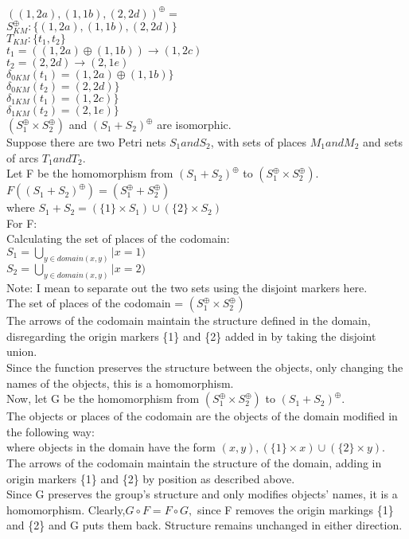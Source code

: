 $((1, 2a), (1, 1b), (2, 2d))^\oplus = $\\
$S_{KM}^\oplus: \{(1, 2a), (1, 1b), (2, 2d) \}$\\
$T_{KM}: \{t_1, t_2\}$\\
$t_1 = ((1, 2a) \oplus (1, 1b)) \rightarrow (1, 2c)$\\
$t_2 = (2, 2d) \rightarrow (2, 1e)$\\
$\delta_{0KM} (t_1) = (1, 2a) \oplus (1, 1b) \}$\\
$\delta_{0KM} (t_2) = (2, 2d) \}$\\
$\delta_{1KM} (t_1) = (1, 2c) \}$\\
$\delta_{1KM} (t_2) = (2, 1e) \}$\\
\smallskip
$(S_1 ^\oplus \times S_2 ^\oplus)$ and $(S_1 + S_2)^\oplus$ are isomorphic. \\
Suppose there are two Petri nets $S_1 and S_2$, with sets of places $M_1 and M_2$ and sets of arcs $T_1 and T_2.$\\
Let F be the homomorphism from $(S_1 + S_2)^\oplus$ to $(S_1 ^\oplus \times S_2 ^\oplus)$. \\
$F((S_1 + S_2)^\oplus) = (S_1 ^\oplus + S_2 ^\oplus)$\\
where $S_1 + S_2 = (\{1\} \times S_1) \cup (\{2\} \times S_2)$\\
For F:\\
Calculating the set of places of the codomain:\\
  $S_1 =  \bigcup_{ y \in domain (x, y)} | x=1)$\\
  $S_2 =  \bigcup_{y \in domain (x, y)} | x=2)$\\
Note: I mean to separate out the two sets using the disjoint markers here.\\
The set of places of the codomain = $(S_1 ^\oplus \times S_2 ^\oplus)$\\
The arrows of the codomain maintain the structure defined in the domain, disregarding the origin markers \{1\} and \{2\} added in by taking the disjoint union.\\
Since the function preserves the structure between the objects, only changing the names of the objects, this is a homomorphism.\\
Now, let G be the homomorphism from $(S_1 ^\oplus \times S_2 ^\oplus)$ to $(S_1 + S_2)^\oplus$. \\
The objects or places of the codomain are the objects of the domain modified in the following way:\\
where objects in the domain have the form $(x, y), (\{1\} \times x) \cup (\{2\} \times y).$\\
The arrows of the codomain maintain the structure of the domain, adding in origin markers \{1\} and \{2\} by position as described above.\\
Since G preserves the group's structure and only modifies objects' names, it is a homomorphism. 
Clearly,$ G \circ F = F \circ G,$ since F removes the origin markings  \{1\} and \{2\} and G puts them back. Structure remains unchanged in either direction.\\
\newpage

